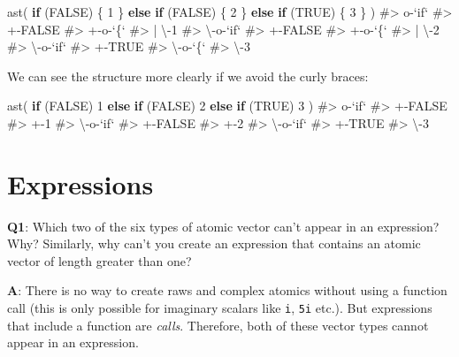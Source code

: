 \documentclass[
]{krantz}
\makeatletter
\newenvironment{Shaded}{\begin{snugshade}}{\end{snugshade}}
\newcommand{\CommentTok}[1]{\textcolor[rgb]{0.56,0.35,0.01}{\textit{#1}}}
\newcommand{\ControlFlowTok}[1]{\textcolor[rgb]{0.13,0.29,0.53}{\textbf{#1}}}
\newcommand{\DecValTok}[1]{\textcolor[rgb]{0.00,0.00,0.81}{#1}}
\newcommand{\KeywordTok}[1]{\textcolor[rgb]{0.13,0.29,0.53}{\textbf{#1}}}
\newcommand{\NormalTok}[1]{#1}
\newcommand{\OtherTok}[1]{\textcolor[rgb]{0.56,0.35,0.01}{#1}}
\newenvironment{kframe}{%
\medskip{}
\setlength{\fboxsep}{.8em}
 \def\at@end@of@kframe{}%
 \ifinner\ifhmode%
  \def\at@end@of@kframe{\end{minipage}}%
  \begin{minipage}{\columnwidth}%
 \fi\fi%
 \def\FrameCommand##1{\hskip\@totalleftmargin \hskip-\fboxsep
 \colorbox{shadecolor}{##1}\hskip-\fboxsep
     \hskip-\linewidth \hskip-\@totalleftmargin \hskip\columnwidth}%
 \MakeFramed {\advance\hsize-\width
   \@totalleftmargin\z@ \linewidth\hsize
   \@setminipage}}%
 {\par\unskip\endMakeFramed%
 \at@end@of@kframe}
\renewenvironment{Shaded}{\begin{kframe}}{\end{kframe}}
\renewcommand{\KeywordTok} [1]{\textcolor[rgb]{0.00,0.44,0.13}{{#1}}}
\renewcommand{\DecValTok}  [1]{\textcolor[rgb]{0.25,0.63,0.44}{{#1}}}
\renewcommand{\CommentTok} [1]{\textcolor[rgb]{0.38,0.63,0.69}{{#1}}}
\renewcommand{\OtherTok}   [1]{\textcolor[rgb]{0.00,0.44,0.13}{{#1}}}
\renewcommand{\NormalTok}  [1]{{#1}}
\makeatother
\begin{document}
\begin{Shaded}
\begin{Highlighting}[]
\KeywordTok{ast}\NormalTok{(}
  \ControlFlowTok{if}\NormalTok{ (}\OtherTok{FALSE}\NormalTok{) \{}
    \DecValTok{1}
\NormalTok{  \} }\ControlFlowTok{else} \ControlFlowTok{if}\NormalTok{ (}\OtherTok{FALSE}\NormalTok{) \{}
    \DecValTok{2}
\NormalTok{  \} }\ControlFlowTok{else} \ControlFlowTok{if}\NormalTok{ (}\OtherTok{TRUE}\NormalTok{) \{}
    \DecValTok{3}
\NormalTok{  \}}
\NormalTok{)}
\CommentTok{#> o-`if` }
\CommentTok{#> +-FALSE }
\CommentTok{#> +-o-`\{` }
\CommentTok{#> | \textbackslash{}-1 }
\CommentTok{#> \textbackslash{}-o-`if` }
\CommentTok{#>   +-FALSE }
\CommentTok{#>   +-o-`\{` }
\CommentTok{#>   | \textbackslash{}-2 }
\CommentTok{#>   \textbackslash{}-o-`if` }
\CommentTok{#>     +-TRUE }
\CommentTok{#>     \textbackslash{}-o-`\{` }
\CommentTok{#>       \textbackslash{}-3}
\end{Highlighting}
\end{Shaded}

We can see the structure more clearly if we avoid the curly braces:

\begin{Shaded}
\begin{Highlighting}[]
\KeywordTok{ast}\NormalTok{(}
  \ControlFlowTok{if}\NormalTok{ (}\OtherTok{FALSE}\NormalTok{) }\DecValTok{1} 
  \ControlFlowTok{else} \ControlFlowTok{if}\NormalTok{ (}\OtherTok{FALSE}\NormalTok{) }\DecValTok{2} 
  \ControlFlowTok{else} \ControlFlowTok{if}\NormalTok{ (}\OtherTok{TRUE}\NormalTok{) }\DecValTok{3}
\NormalTok{)}
\CommentTok{#> o-`if` }
\CommentTok{#> +-FALSE }
\CommentTok{#> +-1 }
\CommentTok{#> \textbackslash{}-o-`if` }
\CommentTok{#>   +-FALSE }
\CommentTok{#>   +-2 }
\CommentTok{#>   \textbackslash{}-o-`if` }
\CommentTok{#>     +-TRUE }
\CommentTok{#>     \textbackslash{}-3}
\end{Highlighting}
\end{Shaded}

\hypertarget{expressions-1}{%
\section{Expressions}\label{expressions-1}}

\textbf{{Q1}}: Which two of the six types of atomic vector can't appear in an expression? Why? Similarly, why can't you create an expression that contains an atomic vector of length greater than one?

\textbf{{A}}: There is no way to create raws and complex atomics without using a function call (this is only possible for imaginary scalars like \texttt{i}, \texttt{5i} etc.). But expressions that include a function are \emph{calls}. Therefore, both of these vector types cannot appear in an expression.
\end{document}
